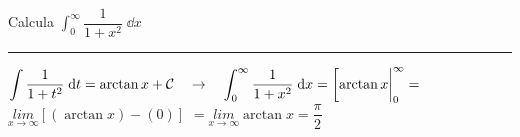 \vspace{4mm}
\begin{miejercicio}
	
	Calcula $\displaystyle \int_0^{\infty} \dfrac {1}{1+x^2}\; \dd x$
\vspace{3mm}

\rule{200pt}{0.1pt}

\vspace{2mm}

$\displaystyle \int \dfrac {1}{1+t^2}\; \dd t = \arctan x + \mathcal C \quad \to \quad \displaystyle \int_0^{\infty} \dfrac {1}{1+x^2}\; \dd x=\eval[\arctan x|_0^{\infty}= $
$\underset {x\to \infty}{lim} \left[ (\arctan x) - (0) \right]$
$=\underset {x\to \infty}{lim}{\arctan x}=\dfrac {\pi}{2}$

\end{miejercicio}

\vspace{4mm}

